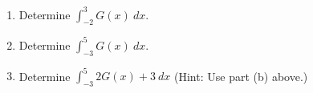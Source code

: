 \documentclass[12pt]{article}
\renewcommand{\emph}[1]{\textsf{\textbf{#1}}}
\let\ds\displaystyle
\newcounter{probcount}
\newcounter{subprobcount}
\def\problem#1{\setcounter{subprobcount}{0}%
\addtocounter{probcount}{1}{\emph{\arabic{probcount}.\hskip 1em(#1)}}\par}
\newenvironment{subproblems}{%
\begin{enumerate}%
\setcounter{enumi}{\value{subprobcount}}%
\renewcommand{\theenumi}{\emph{\alph{enumi}}}}%
{\setcounter{subprobcount}{\value{enumi}}\end{enumerate}}
\begin{document}
	\begin{subproblems}
%	
%	
\item Determine $\ds \int_{-2}^3 G(x) \: dx$.

\vfill

	
\item Determine $\ds \int_{-3}^5 G(x) \: dx$.
	
\vfill

\item Determine $\ds \int_{-3}^5 2 G(x) + 3 \: dx$ (Hint: Use part (b) above.)
	\vfill

	\end{subproblems}



\newpage


%	
%
%	
%	
%	
\end{document}
